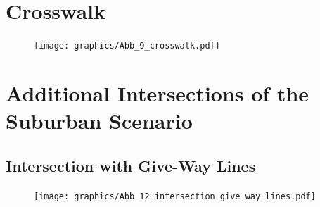 \section{Crosswalk}
\label{fig_crosswalk}
\begin{figure}[H]
	\begin{center}
		\centering\texttt{[image: graphics/Abb\_9\_crosswalk.pdf]}
	\end{center}
\end{figure}
\newpage



\section{Additional Intersections of the Suburban Scenario}
\label{additional_intersections}

\subsection{Intersection with Give-Way Lines}
\label{fig_intersection_give_way_lines}
\begin{figure}[H]
	\begin{center}
		\centering\texttt{[image: graphics/Abb\_12\_intersection\_give\_way\_lines.pdf]}
	\end{center}
\end{figure}

\vspace{-1em}

